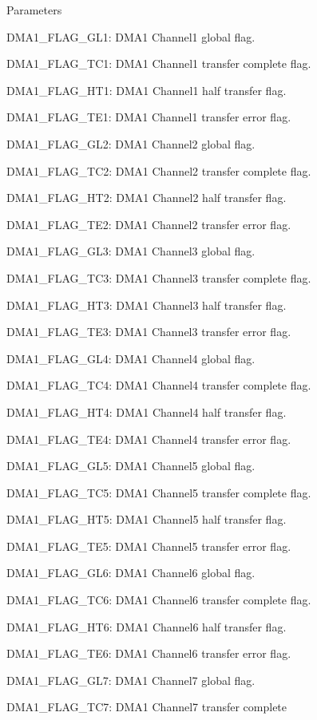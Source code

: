 \begin{DoxyParams}{Parameters}
\begin{DoxyItemize}
\item D\+M\+A1\+\_\+\+F\+L\+A\+G\+\_\+\+G\+L1\+: D\+M\+A1 Channel1 global flag. \item D\+M\+A1\+\_\+\+F\+L\+A\+G\+\_\+\+T\+C1\+: D\+M\+A1 Channel1 transfer complete flag. \item D\+M\+A1\+\_\+\+F\+L\+A\+G\+\_\+\+H\+T1\+: D\+M\+A1 Channel1 half transfer flag. \item D\+M\+A1\+\_\+\+F\+L\+A\+G\+\_\+\+T\+E1\+: D\+M\+A1 Channel1 transfer error flag. \item D\+M\+A1\+\_\+\+F\+L\+A\+G\+\_\+\+G\+L2\+: D\+M\+A1 Channel2 global flag. \item D\+M\+A1\+\_\+\+F\+L\+A\+G\+\_\+\+T\+C2\+: D\+M\+A1 Channel2 transfer complete flag. \item D\+M\+A1\+\_\+\+F\+L\+A\+G\+\_\+\+H\+T2\+: D\+M\+A1 Channel2 half transfer flag. \item D\+M\+A1\+\_\+\+F\+L\+A\+G\+\_\+\+T\+E2\+: D\+M\+A1 Channel2 transfer error flag. \item D\+M\+A1\+\_\+\+F\+L\+A\+G\+\_\+\+G\+L3\+: D\+M\+A1 Channel3 global flag. \item D\+M\+A1\+\_\+\+F\+L\+A\+G\+\_\+\+T\+C3\+: D\+M\+A1 Channel3 transfer complete flag. \item D\+M\+A1\+\_\+\+F\+L\+A\+G\+\_\+\+H\+T3\+: D\+M\+A1 Channel3 half transfer flag. \item D\+M\+A1\+\_\+\+F\+L\+A\+G\+\_\+\+T\+E3\+: D\+M\+A1 Channel3 transfer error flag. \item D\+M\+A1\+\_\+\+F\+L\+A\+G\+\_\+\+G\+L4\+: D\+M\+A1 Channel4 global flag. \item D\+M\+A1\+\_\+\+F\+L\+A\+G\+\_\+\+T\+C4\+: D\+M\+A1 Channel4 transfer complete flag. \item D\+M\+A1\+\_\+\+F\+L\+A\+G\+\_\+\+H\+T4\+: D\+M\+A1 Channel4 half transfer flag. \item D\+M\+A1\+\_\+\+F\+L\+A\+G\+\_\+\+T\+E4\+: D\+M\+A1 Channel4 transfer error flag. \item D\+M\+A1\+\_\+\+F\+L\+A\+G\+\_\+\+G\+L5\+: D\+M\+A1 Channel5 global flag. \item D\+M\+A1\+\_\+\+F\+L\+A\+G\+\_\+\+T\+C5\+: D\+M\+A1 Channel5 transfer complete flag. \item D\+M\+A1\+\_\+\+F\+L\+A\+G\+\_\+\+H\+T5\+: D\+M\+A1 Channel5 half transfer flag. \item D\+M\+A1\+\_\+\+F\+L\+A\+G\+\_\+\+T\+E5\+: D\+M\+A1 Channel5 transfer error flag. \item D\+M\+A1\+\_\+\+F\+L\+A\+G\+\_\+\+G\+L6\+: D\+M\+A1 Channel6 global flag. \item D\+M\+A1\+\_\+\+F\+L\+A\+G\+\_\+\+T\+C6\+: D\+M\+A1 Channel6 transfer complete flag. \item D\+M\+A1\+\_\+\+F\+L\+A\+G\+\_\+\+H\+T6\+: D\+M\+A1 Channel6 half transfer flag. \item D\+M\+A1\+\_\+\+F\+L\+A\+G\+\_\+\+T\+E6\+: D\+M\+A1 Channel6 transfer error flag. \item D\+M\+A1\+\_\+\+F\+L\+A\+G\+\_\+\+G\+L7\+: D\+M\+A1 Channel7 global flag. \item D\+M\+A1\+\_\+\+F\+L\+A\+G\+\_\+\+T\+C7\+: D\+M\+A1 Channel7 transfer complete 
\end{DoxyItemize}
\end{DoxyParams}
